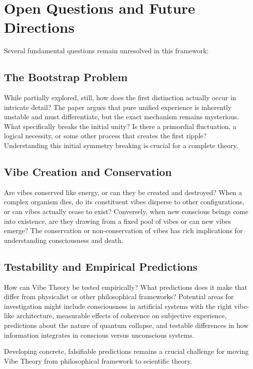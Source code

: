 \section{Open Questions and Future Directions}

Several fundamental questions remain unresolved in this framework:

\subsection{The Bootstrap Problem}

While partially explored, still, how does the first distinction actually occur in intricate detail? The paper argues that pure unified experience is inherently unstable and must differentiate, but the exact mechanism remains mysterious. What specifically breaks the initial unity? Is there a primordial fluctuation, a logical necessity, or some other process that creates the first ripple? Understanding this initial symmetry breaking is crucial for a complete theory.

\subsection{Vibe Creation and Conservation}

Are vibes conserved like energy, or can they be created and destroyed? When a complex organism dies, do its constituent vibes disperse to other configurations, or can vibes actually cease to exist? Conversely, when new conscious beings come into existence, are they drawing from a fixed pool of vibes or can new vibes emerge? The conservation or non-conservation of vibes has rich implications for understanding consciousness and death.

\subsection{Testability and Empirical Predictions}

How can Vibe Theory be tested empirically? What predictions does it make that differ from physicalist or other philosophical frameworks? Potential areas for investigation might include consciousness in artificial systems with the right vibe-like architecture, measurable effects of coherence on subjective experience, predictions about the nature of quantum collapse, and testable differences in how information integrates in conscious versus unconscious systems.

Developing concrete, falsifiable predictions remains a crucial challenge for moving Vibe Theory from philosophical framework to scientific theory.

